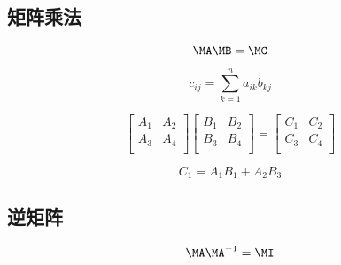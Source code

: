 \subsection{矩阵乘法}

$$\MA \MB = \MC$$

$$c_{ij} = \sum_{k=1}^{n}a_{ik}b_{kj}$$


\begin{equation}
        \begin{bmatrix}
            A_{1} & A_{2} \\
            A_{3} & A_{4} \\
        \end{bmatrix} 
        \begin{bmatrix}
            B_{1} & B_{2} \\
            B_{3} & B_{4} \\
        \end{bmatrix} = 
        \begin{bmatrix}
            C_{1} & C_{2} \\
            C_{3} & C_{4} \\
        \end{bmatrix} 
\end{equation}

$$C_1 = A_1B_1 + A_2B_3$$

\subsection{逆矩阵}

$$\MA \MA^{-1} = \MI$$